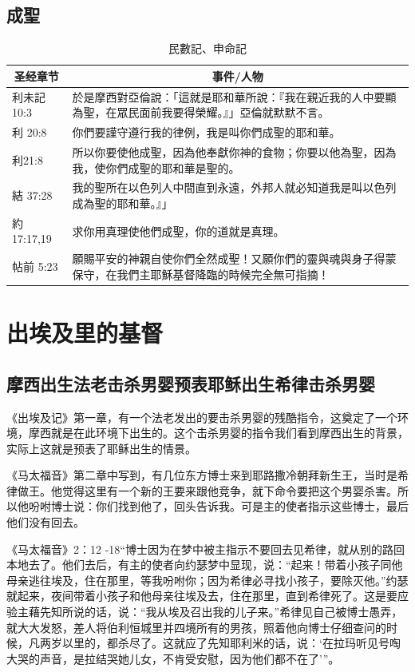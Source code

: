 \subsection{成聖}
\begin{table}[H]
\centering
\begin{tabular}{p{}|p{14cm}}\hline\hline
\multicolumn{1}{c|}{圣经章节}&\multicolumn{1}{c}{事件/人物}\\\hline
利未記 10:3&
於是摩西對亞倫說：「這就是耶和華所說：『我在親近我的人中要顯為聖，在眾民面前我要得榮耀。』」亞倫就默默不言。\\\hline

利 20:8&
你們要謹守遵行我的律例，我是叫你們成聖的耶和華。\\\hline

利21:8&
所以你要使他成聖，因為他奉獻你神的食物；你要以他為聖，因為我，使你們成聖的耶和華是聖的。\\\hline

結 37:28&
我的聖所在以色列人中間直到永遠，外邦人就必知道我是叫以色列成為聖的耶和華。』」\\\hline
約17:17,19&
求你用真理使他們成聖，你的道就是真理。\\\hline

帖前 5:23&
願賜平安的神親自使你們全然成聖！又願你們的靈與魂與身子得蒙保守，在我們主耶穌基督降臨的時候完全無可指摘！
\\\hline
\end{tabular}
\caption{民數記、申命記}
\end{table}


\section{出埃及里的基督}
\subsection{摩西出生法老击杀男婴预表耶稣出生希律击杀男婴}
《出埃及记》第一章，有一个法老发出的要击杀男婴的残酷指令，这奠定了一个环境，摩西就是在此环境下出生的。这个击杀男婴的指令我们看到摩西出生的背景，实际上这就是预表了耶稣出生的情景。

《马太福音》第二章中写到，有几位东方博士来到耶路撒冷朝拜新生王，当时是希律做王。他觉得这里有一个新的王要来跟他竞争，就下命令要把这个男婴杀害。所以他吩咐博士说：你们找到他了，回头告诉我。可是主的使者指示这些博士，最后他们没有回去。

《马太福音》2：12 -18“博士因为在梦中被主指示不要回去见希律，就从别的路回本地去了。他们去后，有主的使者向约瑟梦中显现，说：“起来！带着小孩子同他母亲逃往埃及，住在那里，等我吩咐你；因为希律必寻找小孩子，要除灭他。”约瑟就起来，夜间带着小孩子和他母亲往埃及去，住在那里，直到希律死了。这是要应验主藉先知所说的话，说：“我从埃及召出我的儿子来。”希律见自己被博士愚弄，就大大发怒，差人将伯利恒城里并四境所有的男孩，照着他向博士仔细查问的时候，凡两岁以里的，都杀尽了。这就应了先知耶利米的话，说：‘在拉玛听见号啕大哭的声音，是拉结哭她儿女，不肯受安慰，因为他们都不在了’”。

